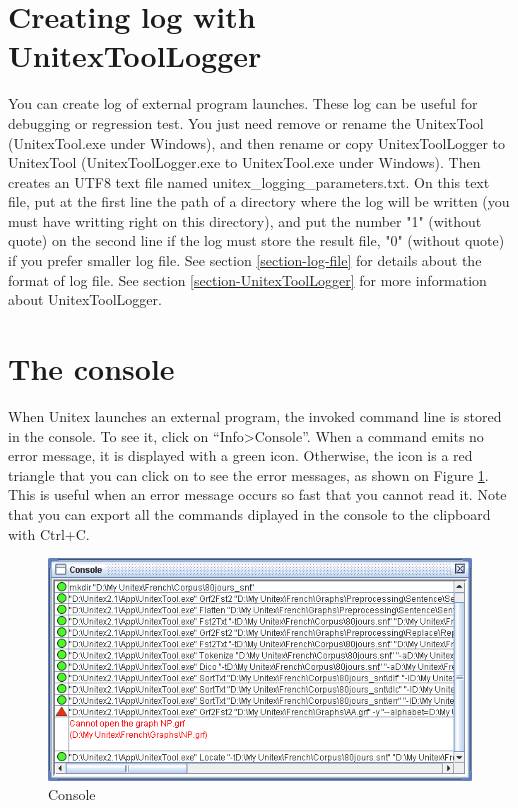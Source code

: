 \section{Creating log with UnitexToolLogger}
\label{section-creating-log-UnitexToolLogger}
You can create log of external program launches. These log can be useful for debugging
or regression test. You just need remove or rename the UnitexTool (UnitexTool.exe under
Windows), and then rename or copy UnitexToolLogger to UnitexTool (UnitexToolLogger.exe
to UnitexTool.exe under Windows). Then creates an UTF8 text file
named unitex\_logging\_parameters.txt. On this text file, put at the first line the path of
a directory where the log will be written (you must have writting right on this directory),
and put the number "1" (without quote) on the second line if the log must store the result
file, "0" (without quote) if you prefer smaller log file. See section \ref{section-log-file} 
for details about the format of log file. See section \ref{section-UnitexToolLogger} for
more information about UnitexToolLogger.


\section{The console}
\label{section-console}
When Unitex launches an external program, the invoked command line is stored in
the console. To see it, click on ``Info>Console''. When a command emits
no error message, it is displayed with a green icon. Otherwise, the icon is a red
triangle that you can click on to see the error messages, as shown on Figure
\ref{fig-console}. This is useful when an error message occurs so fast that you
cannot read it. Note that you can export all the commands diplayed in the
console to the clipboard with Ctrl+C.

\bigskip
\begin{figure}[!h]
\begin{center}
\includegraphics[width=15cm]{resources/img/fig11-2.png}
\caption{Console\label{fig-console}}
\end{center}
\end{figure}


